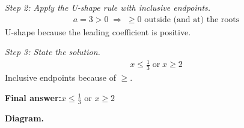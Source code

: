 \documentclass[11pt]{article}
\begin{document}
\textit{Step 2: Apply the U-shape rule with inclusive endpoints.}
\[\begin{gathered}
a = 3 > 0 \;\Longrightarrow\; \geq 0 \text{ outside (and at) the roots}
\end{gathered}\]
U-shape because the leading coefficient is positive.

\textit{Step 3: State the solution.}
\[\begin{gathered}
x \leq \tfrac{1}{3} \;\text{or}\; x \geq 2
\end{gathered}\]
Inclusive endpoints because of \( \geq \).

\begin{answerbox}
\textbf{Final answer:}\quad \(\displaystyle x \leq \tfrac{1}{3}\) or \(\displaystyle x \geq 2\)
\end{answerbox}
\textbf{Diagram.}
\end{document}
